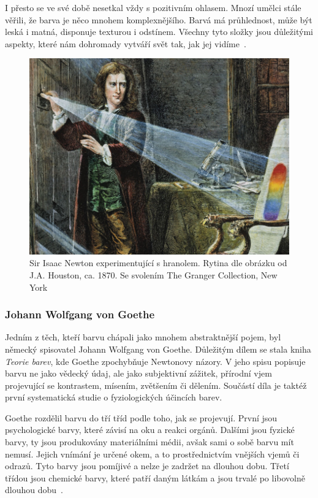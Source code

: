 I přesto se ve své době nesetkal vždy s pozitivním ohlasem. Mnozí umělci stále věřili, 
že barva je něco mnohem komplexnějšího. Barvá má průhlednost, může být leská i matná, disponuje texturou i odstínem. Všechny tyto složky jsou důležitými aspekty, 
které nám dohromady vytváří svět tak, jak jej vidíme~\cite{gage2023colour}.

\begin{figure}[!htbp]
    \centering
    \includegraphics[width=0.7\linewidth]{images/sir_newton.png}
    \caption{Sir Isaac Newton experimentující s hranolem. Rytina dle obrázku od J.A. Houston, ca. 1870. Se svolením The Granger Collection, New York~\cite{sirIsaacNewton}}
    \label{fig:Sir Isaac Newton}
\end{figure}

\subsubsection{Johann Wolfgang von Goethe}
Jedním z těch, kteří barvu chápali jako mnohem abstraktnější pojem, byl německý spisovatel Johann Wolfgang von Goethe. Důležitým dílem se stala kniha \emph{Teorie barev}, kde Goethe zpochybňuje
Newtonovy názory. V jeho spisu popisuje barvu ne jako vědecký údaj, ale jako subjektivní zážitek, přírodní vjem projevující se kontrastem, mísením, zvětšením či dělením.
Součástí díla je taktéž první systematická studie o fyziologických účincích barev. 

Goethe rozdělil barvu do tří tříd podle toho, jak
se projevují. První jsou psychologické barvy, které závisí na oku a reakci orgánů. Dalšími jsou fyzické barvy, ty jsou produkovány materiálními médii, avšak sami o sobě barvu mít nemusí. Jejich vnímání je určené okem, a to 
prostřednictvím vnějších vjemů či odrazů. Tyto barvy jsou pomíjivé a nelze je zadržet na dlouhou dobu. Třetí třídou jsou chemické barvy, které patří daným látkám a jsou trvalé po libovolně dlouhou dobu~\cite{goethe1840}.


